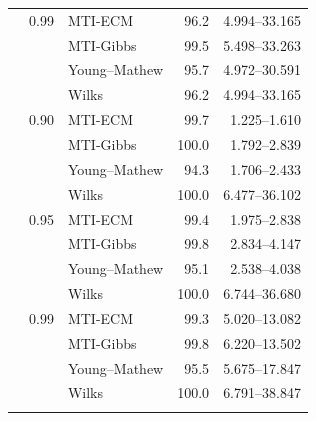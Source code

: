 \begin{longtable}{@{}rrlrr@{}}
\addlinespace[0.3em]
500 & 0.99 & MTI-ECM & 96.2 & 4.994--33.165 \\
 &  & MTI-Gibbs & 99.5 & 5.498--33.263 \\
 &  & Young--Mathew & 95.7 & 4.972--30.591 \\
 &  & Wilks & 96.2 & 4.994--33.165 \\
\addlinespace[0.3em]
1000 & 0.90 & MTI-ECM & 99.7 & 1.225--1.610 \\
 &  & MTI-Gibbs & 100.0 & 1.792--2.839 \\
 &  & Young--Mathew & 94.3 & 1.706--2.433 \\
 &  & Wilks & 100.0 & 6.477--36.102 \\
\addlinespace[0.3em]
1000 & 0.95 & MTI-ECM & 99.4 & 1.975--2.838 \\
 &  & MTI-Gibbs & 99.8 & 2.834--4.147 \\
 &  & Young--Mathew & 95.1 & 2.538--4.038 \\
 &  & Wilks & 100.0 & 6.744--36.680 \\
\addlinespace[0.3em]
1000 & 0.99 & MTI-ECM & 99.3 & 5.020--13.082 \\
 &  & MTI-Gibbs & 99.8 & 6.220--13.502 \\
 &  & Young--Mathew & 95.5 & 5.675--17.847 \\
 &  & Wilks & 100.0 & 6.791--38.847 \\
\addlinespace[0.3em]
\end{longtable}
\endgroup
